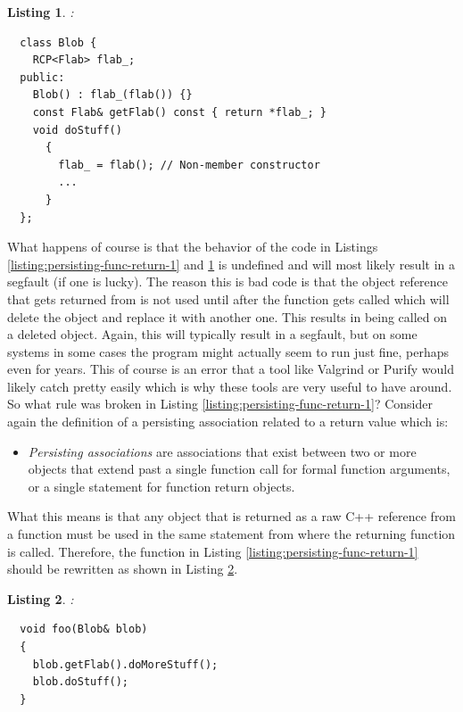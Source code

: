 \documentclass[pdf,ps2pdf,11pt]{SANDreport}
\newtheorem{listing}{Listing}
\begin{document}
\begin{listing}:\\
\label{listing:bad-Blob-non-persisting}
{\small\begin{verbatim}
  class Blob {
    RCP<Flab> flab_;
  public:
    Blob() : flab_(flab()) {}
    const Flab& getFlab() const { return *flab_; }
    void doStuff()
      {
        flab_ = flab(); // Non-member constructor
        ...
      }
  };
\end{verbatim}}
\end{listing}

What happens of course is that the behavior of the code in Listings
{}\ref{listing:persisting-func-return-1} and
{}\ref{listing:bad-Blob-non-persisting} is undefined and will most
likely result in a segfault (if one is lucky).  The reason this is bad
code is that the {} object reference that gets returned from
{} is not used until after the function
{} gets called which will delete the {}
object and replace it with another one.  This results in
{} being called on a deleted object.  Again,
this will typically result in a segfault, but on some systems in some
cases the program might actually seem to run just fine, perhaps even
for years.  This of course is an error that a tool like Valgrind or
Purify would likely catch pretty easily which is why these tools are
very useful to have around.  So what rule was broken in Listing
{}\ref{listing:persisting-func-return-1}?  Consider again the
definition of a persisting association related to a return value which
is:

\begin{itemize}

{}\item\textit{Persisting associations} are associations that exist
between two or more objects that extend past a single function call
for formal function arguments, or a single statement for function
return objects.

\end{itemize}

What this means is that any object that is returned as a raw C++
reference from a function must be used in the same statement from
where the returning function is called.  Therefore, the function in
Listing {}\ref{listing:persisting-func-return-1} should be rewritten
as shown in Listing {}\ref{listing:non-persisting-func-return-1}.

\begin{listing}:\\
\label{listing:non-persisting-func-return-1}
{\small\begin{verbatim}
  void foo(Blob& blob)
  {
    blob.getFlab().doMoreStuff();
    blob.doStuff();
  }
\end{verbatim}}
\end{listing}
\end{document}
